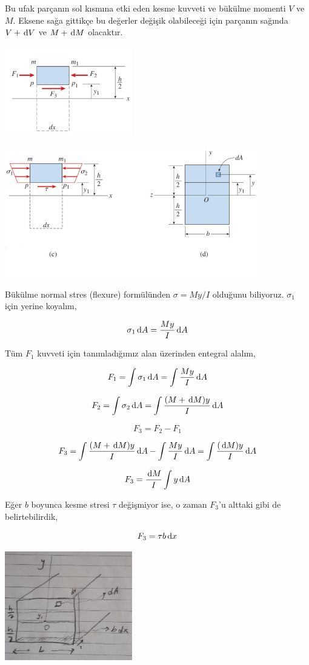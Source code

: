 \documentclass[12pt,fleqn]{article}\usepackage{../../common}
\begin{document}
Bu ufak parçanın sol kısmına etki eden kesme kuvveti ve bükülme momenti
$V$ ve $M$. Eksene sağa gittikçe bu değerler değişik olabileceği için
parçanın sağında $V + \,\mathrm{d} V$ ve $M + \,\mathrm{d} M$ olacaktır. 

\includegraphics[width=15em]{phy_020_strs_02_04.jpg}

\includegraphics[width=30em]{phy_020_strs_02_03.jpg}

Bükülme normal stres (flexure) formülünden $\sigma = My / I$ olduğunu
biliyoruz. $\sigma_1$ için yerine koyalım,

$$
\sigma_1 \,\mathrm{d} A = \frac{My}{I} \,\mathrm{d} A
$$

Tüm $F_1$ kuvveti için tanımladığımız alan üzerinden entegral alalım,

$$
F_1 = \int \sigma_1 \,\mathrm{d} A = \int \frac{My}{I} \,\mathrm{d} A
$$

$$
F_2 = \int \sigma_2 \,\mathrm{d} A = \int \frac{(M + \,\mathrm{d} M)y}{I} \,\mathrm{d} A
$$

$$
F_3 = F_2 - F_1
$$

$$
F_3 = \int \frac{(M + \,\mathrm{d} M)y}{I} \,\mathrm{d} A -  \int \frac{My}{I} \,\mathrm{d} A =
\int \frac{(\,\mathrm{d} M)y}{I} \,\mathrm{d} A
$$

$$
F_3 = \frac{\,\mathrm{d} M}{I} \int y \,\mathrm{d} A
$$

Eğer $b$ boyunca kesme stresi $\tau$ değişmiyor ise, o zaman $F_3$'u alttaki
gibi de belirtebilirdik,

$$
F_3 = \tau b \,\mathrm{d} x
$$

\includegraphics[width=15em]{phy_020_strs_02_05.jpg}
\end{document}

